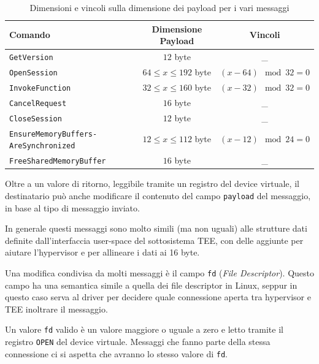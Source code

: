 \documentclass[12pt,italian]{report}
\begin{document}
\begin{table}
    \centering
    \begin{tabular}{|m{5.3cm}|c|c|}
        \hline
        \textbf{Comando}    & \textbf{Dimensione Payload} & \textbf{Vincoli}    \\
        \hline
        \texttt{GetVersion}                             & $12$ byte                 & \_                     \\
        \texttt{OpenSession}                            & $64 \leq x \leq 192$ byte & $(x - 64) \mod 32 = 0$ \\
        \texttt{InvokeFunction}                         & $32 \leq x \leq 160$ byte & $(x - 32) \mod 32 = 0$ \\
        \texttt{CancelRequest}                          & $16$ byte                 & \_                     \\
        \texttt{CloseSession}                           & $12$ byte                 & \_                     \\
        \texttt{EnsureMemoryBuffers-AreSynchronized}    & $12 \leq x \leq 112$ byte & $(x - 12) \mod 24 = 0$ \\
        \texttt{FreeSharedMemoryBuffer}                 & $16$ byte                 & \_                     \\
        \hline
    \end{tabular}
    \caption{
        Dimensioni e vincoli sulla dimensione dei payload per i vari messaggi
    }
    \label{tab:dimensioni-valide-payload}
\end{table}

Oltre a un valore di ritorno, leggibile tramite un registro del device
virtuale, il destinatario può anche modificare il contenuto del campo
\texttt{payload} del messaggio, in base al tipo di messaggio inviato.

In generale questi messaggi sono molto simili (ma non uguali) alle strutture
dati definite dall'interfaccia user-space del sottosistema TEE, con delle
aggiunte per aiutare l'hypervisor e per allineare i dati ai 16 byte.

Una modifica condivisa da molti messaggi è il campo \texttt{fd}
(\textit{File Descriptor}). Questo campo ha una semantica simile a quella
dei file descriptor in Linux, seppur in questo caso serva al driver per decidere
quale connessione aperta tra hypervisor e TEE inoltrare il messaggio.

Un valore \texttt{fd} valido è un valore maggiore o uguale a zero e letto
tramite il registro \texttt{OPEN} del device virtuale.
Messaggi che fanno parte della stessa connessione ci si aspetta che avranno
lo stesso valore di \texttt{fd}.
\end{document}
